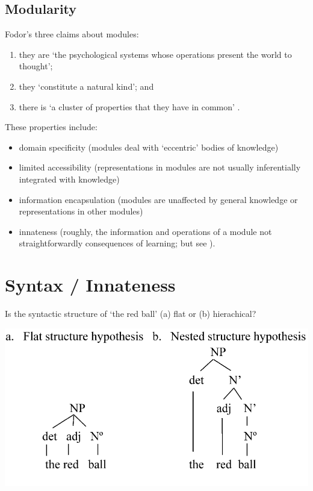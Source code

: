 \documentclass[12pt]{extarticle}
\begin{document}
\begin{multicols}{3}
\subsection{Modularity}
 
Fodor’s three claims about modules:
 
\begin{enumerate}
 
\item they are ‘the psychological systems whose operations present the world to thought’;
 
\item they ‘constitute a natural kind’; and
 
\item there is ‘a cluster of properties that they have in common’ \citep[p.\ 101]{Fodor:1983dg}.
 
\end{enumerate}
 
These properties include:
 
\begin{itemize}
 
\item domain specificity (modules deal with ‘eccentric’ bodies of knowledge)
 
\item limited accessibility (representations in modules are not usually inferentially integrated with knowledge)
 
\item information encapsulation (modules are unaffected by general knowledge or representations in other modules)
 
\item innateness (roughly, the information and operations of a module not straightforwardly consequences of learning; but see \citet{Samuels:2004ho}).
 
\end{itemize}
 
 
 
\section{Syntax / Innateness}
 
Is the syntactic structure of ‘the red ball’ (a) flat or (b) hierachical?
 
\begin{center}
 
\includegraphics[scale=0.25]{../www.slides/src/raw/img/lidz_2003_fig0.neg.png}
 

\end{center}
\end{multicols}
\end{document}
